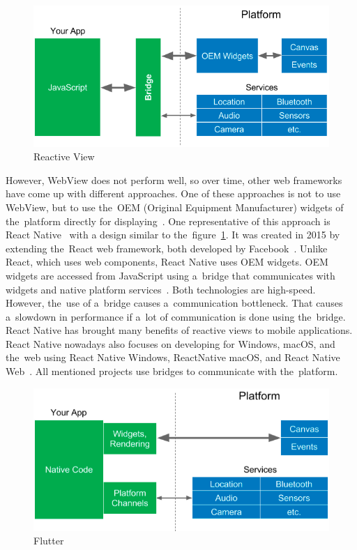 \begin{figure}
    \centering
    \includegraphics[width=1\linewidth]{assets/design/reactive.png}
    \caption{Reactive View~\cite{leler_2017_whats}}
    \label{fig:design:reactiveview}
\end{figure}

However, WebView does not perform well, so over time, other web frameworks have come up with different approaches.
One of these approaches is not to use WebView, but to use the~OEM (Original Equipment Manufacturer) widgets of the~platform directly for displaying~\cite{leler_2017_whats}.
One representative of this approach is React Native~\cite{a2022_react} with a design similar to the~figure~\ref{fig:design:reactiveview}.
It was created in 2015 by extending the~React web framework, both developed by Facebook~\cite{a2022_react}.
Unlike React, which uses web components, React Native uses OEM widgets.
OEM widgets are accessed from JavaScript using a~bridge that communicates with widgets and native platform services~\cite{leler_2017_whats}.
Both technologies are high-speed.
However, the~use of a~bridge causes a~communication bottleneck.
That causes a~slowdown in performance if a~lot of communication is done using the~bridge.
React Native has brought many benefits of reactive views to mobile applications.
React Native nowadays also focuses on developing for Windows, macOS, and the~web using React Native Windows, ReactNative macOS, and React Native Web~\cite{a2022_react}.
All mentioned projects use bridges to communicate with the~platform.

\begin{figure}
    \centering
    \includegraphics[width=1\linewidth]{assets/design/flutter.png}
    \caption{Flutter~\cite{leler_2017_whats}}
    \label{fig:design:flutterview}
\end{figure}

